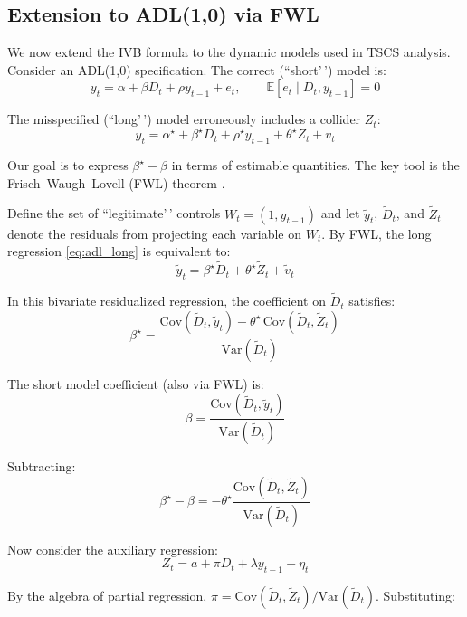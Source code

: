 \documentclass[
]{article}
\begin{document}
\subsection{\texorpdfstring{Extension to ADL(1,0) via FWL
\label{sec:adl10}}{Extension to ADL(1,0) via FWL }}\label{extension-to-adl10-via-fwl}

We now extend the IVB formula to the dynamic models used in TSCS
analysis. Consider an ADL(1,0) specification. The correct (``short'\,')
model is: \begin{equation}
y_t = \alpha + \beta D_t + \rho y_{t-1} + e_t, \qquad \mathbb{E}[e_t \mid D_t, y_{t-1}] = 0
\label{eq:adl_short}
\end{equation}

The misspecified (``long'\,') model erroneously includes a collider
\(Z_t\): \begin{equation}
y_t = \alpha^{\star} + \beta^{\star} D_t + \rho^{\star} y_{t-1} + \theta^{\star} Z_t + v_t
\label{eq:adl_long}
\end{equation}

Our goal is to express \(\beta^{\star} - \beta\) in terms of estimable
quantities. The key tool is the Frisch--Waugh--Lovell (FWL) theorem
\citep{frisch1933partial, lovell1963seasonal}.

Define the set of ``legitimate'\,' controls \(W_t = (1, y_{t-1})\) and
let \(\tilde{y}_t\), \(\tilde{D}_t\), and \(\tilde{Z}_t\) denote the
residuals from projecting each variable on \(W_t\). By FWL, the long
regression \eqref{eq:adl_long} is equivalent to: \[
\tilde{y}_t = \beta^{\star} \tilde{D}_t + \theta^{\star} \tilde{Z}_t + \tilde{v}_t
\]

In this bivariate residualized regression, the coefficient on
\(\tilde{D}_t\) satisfies: \[
\beta^{\star} = \frac{\text{Cov}(\tilde{D}_t, \tilde{y}_t) - \theta^{\star}\,\text{Cov}(\tilde{D}_t, \tilde{Z}_t)}{\text{Var}(\tilde{D}_t)}
\]

The short model coefficient (also via FWL) is: \[
\beta = \frac{\text{Cov}(\tilde{D}_t, \tilde{y}_t)}{\text{Var}(\tilde{D}_t)}
\]

Subtracting: \[
\beta^{\star} - \beta = -\theta^{\star} \frac{\text{Cov}(\tilde{D}_t, \tilde{Z}_t)}{\text{Var}(\tilde{D}_t)}
\]

Now consider the auxiliary regression: \begin{equation}
Z_t = a + \pi D_t + \lambda y_{t-1} + \eta_t
\label{eq:aux_adl}
\end{equation}

By the algebra of partial regression,
\(\pi = \text{Cov}(\tilde{D}_t, \tilde{Z}_t) / \text{Var}(\tilde{D}_t)\).
Substituting:
\end{document}
